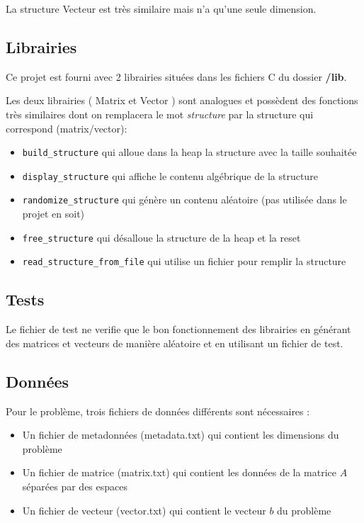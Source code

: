 \documentclass[11pt, a4paper]{article}
\begin{document}
La structure Vecteur est très similaire mais n'a qu'une seule dimension.\\

\subsection{Librairies}

Ce projet est fourni avec 2 librairies situées dans les fichiers C du dossier \textbf{/lib}.

Les deux librairies ( Matrix et Vector ) sont analogues et possèdent des fonctions très similaires dont on remplacera le mot \textit{structure} par la structure qui correspond (matrix/vector):

\begin{itemize}
    \item \texttt{build\_structure} qui alloue dans la heap la structure avec la taille souhaitée
    \item \texttt{display\_structure} qui affiche le contenu algébrique de la structure
    \item \texttt{randomize\_structure} qui génère un contenu aléatoire (pas utilisée dans le projet en soit)
    \item \texttt{free\_structure} qui désalloue la structure de la heap et la reset
    \item \texttt{read\_structure\_from\_file} qui utilise un fichier pour remplir la structure
\end{itemize}

\newpage

\subsection{Tests}

Le fichier de test ne verifie que le bon fonctionnement des librairies en générant des matrices et vecteurs de manière aléatoire et en utilisant un fichier de test.

\subsection{Données}

Pour le problème, trois fichiers de données différents sont nécessaires :
\begin{itemize}
    \item Un fichier de metadonnées (metadata.txt) qui contient les dimensions du problème
    \item Un fichier de matrice (matrix.txt) qui contient les données de la matrice $A$ séparées par des espaces
    \item Un fichier de vecteur (vector.txt) qui contient le vecteur $b$ du problème
\end{itemize}
\end{document}

